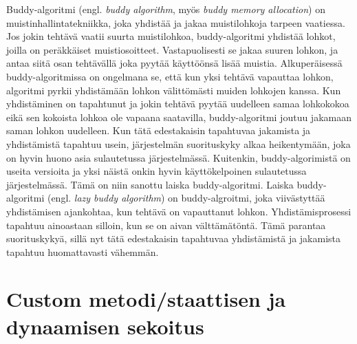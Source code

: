 Buddy-algoritmi (engl. \textit{buddy algorithm}, myös \textit{buddy memory allocation}) on muistinhallintatekniikka, joka yhdistää ja jakaa muistilohkoja tarpeen vaatiessa. Jos jokin tehtävä vaatii suurta muistilohkoa, buddy-algoritmi yhdistää lohkot, joilla on peräkkäiset muistiosoitteet. Vastapuolisesti se jakaa suuren lohkon, ja antaa siitä osan tehtävällä joka pyytää käyttöönsä lisää muistia. Alkuperäisessä buddy-algoritmissa on ongelmana se, että kun yksi tehtävä vapauttaa lohkon, algoritmi pyrkii yhdistämään lohkon välittömästi muiden lohkojen kanssa. Kun yhdistäminen on tapahtunut ja jokin tehtävä pyytää uudelleen samaa lohkokokoa eikä sen kokoista lohkoa ole vapaana saatavilla, buddy-algoritmi joutuu jakamaan saman lohkon uudelleen. Kun tätä edestakaisin tapahtuvaa jakamista ja yhdistämistä tapahtuu usein, järjestelmän suorituskyky alkaa heikentymään, joka on hyvin huono asia sulautetussa järjestelmässä. Kuitenkin, buddy-algorimistä on useita versioita ja yksi näistä onkin hyvin käyttökelpoinen sulautetussa järjestelmässä. Tämä on niin sanottu laiska buddy-algoritmi. Laiska buddy-algoritmi (engl. \textit{lazy buddy algorithm}) on buddy-algroitmi, joka viivästyttää yhdistämisen ajankohtaa, kun tehtävä on vapauttanut lohkon. Yhdistämisprosessi tapahtuu ainoastaan silloin, kun se on aivan välttämätöntä. Tämä parantaa suorituskykyä, sillä nyt tätä edestakaisin tapahtuvaa yhdistämistä ja jakamista tapahtuu huomattavasti vähemmän.\cite{soeosmm@2009}


\section{Custom metodi/staattisen ja dynaamisen sekoitus}





